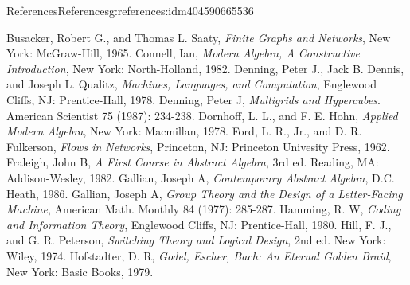 \documentclass[twoside,10pt,]{book}
\numberwithin{equation}{section}
\begin{document}
\begin{references-chapter-numberless}{References}{}{References}{}{}{g:references:idm404590665536}
\begin{referencelist}
\label{x:biblio:busacker-1965}{}\hypertarget{x:biblio:busacker-1965}{}Busacker, Robert G., and Thomas L. Saaty, \textit{Finite Graphs and Networks}, New York: McGraw-Hill, 1965.
\label{x:biblio:biblio-connell-1982}{}\hypertarget{x:biblio:biblio-connell-1982}{}Connell, Ian, \textit{Modern Algebra, A Constructive Introduction}, New York: North-Holland, 1982.
\label{x:biblio:biblio-denning-1978}{}\hypertarget{x:biblio:biblio-denning-1978}{}Denning, Peter J., Jack B. Dennis, and Joseph L. Qualitz, \textit{Machines, Languages, and Computation}, Englewood Cliffs, NJ: Prentice-Hall, 1978.
\label{x:biblio:biblio-denning-1987}{}\hypertarget{x:biblio:biblio-denning-1987}{}Denning, Peter J, \textit{Multigrids and Hypercubes}. American Scientist 75 (1987): 234-238.
\label{x:biblio:biblio-dornhoff-1978}{}\hypertarget{x:biblio:biblio-dornhoff-1978}{}Dornhoff, L. L., and F. E. Hohn, \textit{Applied Modern Algebra}, New York: Macmillan, 1978.
\label{x:biblio:biblio-ford-1962}{}\hypertarget{x:biblio:biblio-ford-1962}{}Ford, L. R., Jr., and D. R. Fulkerson, \textit{Flows in Networks},  Princeton, NJ: Princeton Univesity Press, 1962.
\label{x:biblio:biblio-fraleigh-1982}{}\hypertarget{x:biblio:biblio-fraleigh-1982}{}Fraleigh, John B, \textit{A First Course in Abstract Algebra}, 3rd ed. Reading, MA: Addison-Wesley, 1982.
\label{x:biblio:biblio-gallian-1986}{}\hypertarget{x:biblio:biblio-gallian-1986}{}Gallian, Joseph A, \textit{Contemporary Abstract Algebra}, D.C. Heath, 1986.
\label{x:biblio:biblio-gallian-1977}{}\hypertarget{x:biblio:biblio-gallian-1977}{}Gallian, Joseph A, \textit{Group Theory and the Design of a Letter-Facing Machine}, American Math. Monthly 84 (1977): 285-287.
\label{x:biblio:biblio-hamming-1980}{}\hypertarget{x:biblio:biblio-hamming-1980}{}Hamming, R. W, \textit{Coding and Information Theory}, Englewood Cliffs, NJ: Prentice-Hall, 1980.
\label{x:biblio:biblio-hill-1974}{}\hypertarget{x:biblio:biblio-hill-1974}{}Hill, F. J., and G. R. Peterson, \textit{Switching Theory and Logical Design}, 2nd ed. New York: Wiley, 1974.
\label{x:biblio:biblio-hofstadter-1979}{}\hypertarget{x:biblio:biblio-hofstadter-1979}{}Hofstadter, D. R, \textit{Godel, Escher, Bach: An Eternal Golden Braid}, New York: Basic Books, 1979.

\end{referencelist}
\end{references-chapter-numberless}
\end{document}

